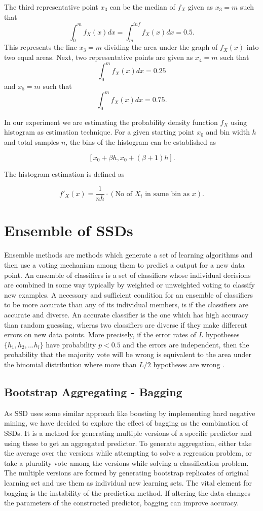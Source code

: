 \documentclass[conference]{IEEEtran}
\begin{document}
The third representative point $x_3$ can be the median of  $f_X$ given as $x_3 = m$ such that $$\int_{0}^{m} f_X(x) dx = \int_{m}^{inf} f_X(x) dx = 0.5.$$ This represents the line $x_3 = m$ dividing the area under the graph of $f_X(x)$ into two equal areas. Next, two representative points are given as $x_4 = m$ such that $$\int_{0}^{m} f_X(x) dx = 0.25$$ and $x_5 = m$ such that $$\int_{0}^{m} f_X(x) dx = 0.75.$$

In our experiment we are estimating the probability density function $f_X$ using histogram as estimation technique. For a given starting point $x_0$ and bin width $h$ and total samples $n$, the bins of the histogram can be established as

$$ [x_0 + \beta h, x_0 + (\beta + 1)h].$$

The histogram estimation is defined as 

$$f'{_X}(x) = \frac{1}{nh} \cdot (\textrm{No of } X_i \textrm{ in same bin as }x).$$

\section{Ensemble of SSDs}
Ensemble methods are methods which generate a set of learning algorithms and then use a voting mechanism among them to predict a output for a new data point. An ensemble of classifiers is a set of classifiers whose individual decisions are combined in some way typically by weighted or unweighted voting to classify new examples. A necessary and sufficient condition for an ensemble of classifiers to be more accurate than any of its individual members, is if the classifiers are accurate and diverse. An accurate classifier is the one which has high accuracy than random guessing, wheras two classifiers are diverse if they make different errors on new data points. More precisely, if the error rates of $L$ hypotheses $\{h_1, h_2, ... h_l\}$ have probability $p < 0.5$ and the errors are independent, then the probability that the majority vote will be wrong is equivalent to the area under the binomial distribution where more than $L/2$ hypotheses are wrong \cite{dietterich2002ensemble}.

\subsection{Bootstrap Aggregating - Bagging}
As SSD uses some similar approach like boosting \cite{freund1996experiments} by implementing hard negative mining, we have decided to explore the effect of bagging \cite{Breiman1996,breiman1996heuristics} as the combination of SSDs. It is a method for generating multiple versions of a specific predictor and using these to get an aggregated predictor. To generate aggregation, either take the average over the versions while attempting to solve a regression problem, or take a plurality vote among the versions while solving a classification problem. The multiple versions are formed by generating bootstrap replicates of original learning set and use them as individual new learning sets. The vital element for bagging is the instability of the prediction method. If altering the data changes the parameters of the constructed predictor, bagging can improve accuracy. 
\end{document}
